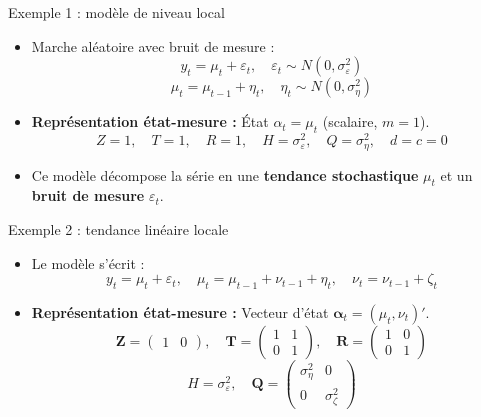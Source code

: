\documentclass[11pt,aspectratio=169]{beamer}
\begin{document}
\begin{frame}{Exemple 1 : modèle de niveau local}

\begin{itemize}

\item Marche aléatoire avec bruit de mesure :
  \[
  y_t = \mu_t + \varepsilon_t, \quad \varepsilon_t \sim N(0, \sigma_\varepsilon^2)
  \]
  \[
  \mu_t = \mu_{t-1} + \eta_t, \quad \eta_t \sim N(0, \sigma_\eta^2)
  \]\newline

\item \textbf{Représentation état-mesure :} État $\alpha_t = \mu_t$ (scalaire, $m = 1$).
  \[
  Z = 1, \quad T = 1, \quad R = 1, \quad H = \sigma_\varepsilon^2, \quad Q = \sigma_\eta^2, \quad d = c = 0
  \]\newline

\item Ce modèle décompose la série en une \textbf{tendance stochastique} $\mu_t$ et un \textbf{bruit de mesure} $\varepsilon_t$.

\end{itemize}

\end{frame}

\begin{frame}{Exemple 2 : tendance linéaire locale}

\begin{itemize}

\item Le modèle s'écrit :
  \[
  y_t = \mu_t + \varepsilon_t, \quad \mu_t = \mu_{t-1} + \nu_{t-1} + \eta_t, \quad \nu_t = \nu_{t-1} + \zeta_t
  \]\newline

\item \textbf{Représentation état-mesure :} Vecteur d'état $\bm{\alpha}_t = (\mu_t, \nu_t)'$.
  \[
  \bm{Z} = \begin{pmatrix} 1 & 0 \end{pmatrix}, \quad
  \bm{T} = \begin{pmatrix} 1 & 1 \\ 0 & 1 \end{pmatrix}, \quad
  \bm{R} = \begin{pmatrix} 1 & 0 \\ 0 & 1 \end{pmatrix}
  \]
  \[
  H = \sigma_\varepsilon^2, \quad
  \bm{Q} = \begin{pmatrix} \sigma_\eta^2 & 0 \\ 0 & \sigma_\zeta^2 \end{pmatrix}
  \]

\end{itemize}

\end{frame}
\end{document}
